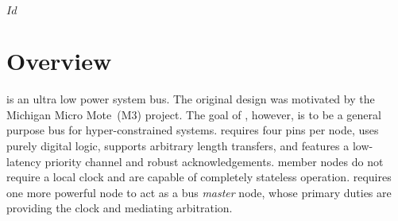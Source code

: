 \svnInfo $Id$

\section*{Overview}
\bus is an ultra low power system bus. The original design was motivated by
the Michigan Micro Mote~(M3) project. The goal of \bus, however, is to be a
general purpose bus for hyper-constrained systems. \bus requires four pins per
node, uses purely digital logic, supports arbitrary length transfers, and
features a low-latency priority channel and robust acknowledgements. \bus
member nodes do not require a local clock and are capable of completely
stateless operation. \bus requires one more powerful node to act as a bus {\em
master} node, whose primary duties are providing the \bus clock and mediating
arbitration.
